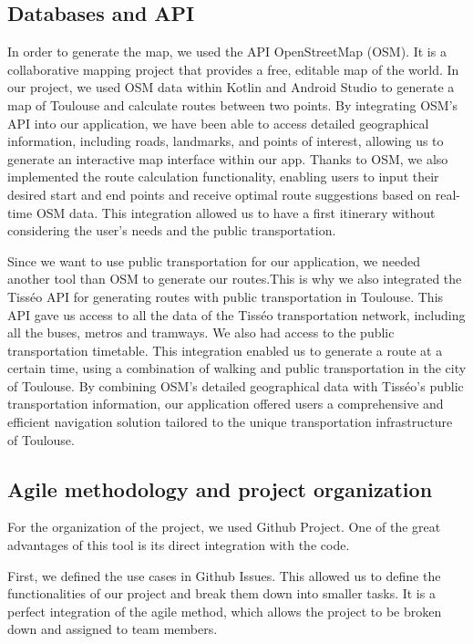 \subsection{Databases and API}
In order to generate the map, we used the API OpenStreetMap (OSM). It is a collaborative mapping project that provides a free, editable map of the world. In our project, we used OSM data within Kotlin and Android Studio to generate a map of Toulouse and calculate routes between two points. By integrating OSM's API into our application, we have been able to access detailed geographical information, including roads, landmarks, and points of interest, allowing us to generate an interactive map interface within our app. Thanks to OSM, we also implemented the route calculation functionality, enabling users to input their desired start and end points and receive optimal route suggestions based on real-time OSM data. This integration allowed us to have a first itinerary without considering the user’s needs and the public transportation. \newline

Since we want to use public transportation for our application, we needed another tool than OSM to generate our routes.This is why we also integrated the Tisséo API for generating routes with public transportation in Toulouse. This API gave us access to all the data of the Tisséo transportation network, including all the buses, metros and tramways. We also had access to the public transportation timetable. This integration enabled us to generate a route at a certain time, using a combination of walking and public transportation in the city of Toulouse. By combining OSM's detailed geographical data with Tisséo's public transportation information, our application offered users a comprehensive and efficient navigation solution tailored to the unique transportation infrastructure of Toulouse. \newline

\subsection{Agile methodology and project organization}

For the organization of the project, we used Github Project.
One of the great advantages of this tool is its direct integration with the code.

First, we defined the use cases in Github Issues.
This allowed us to define the functionalities of our project and break them down into smaller tasks.
It is a perfect integration of the agile method, which allows the project to be broken down and assigned to team members.

